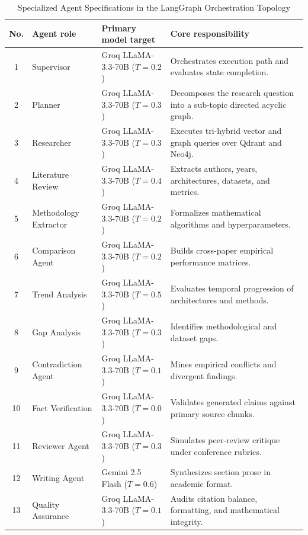 \documentclass[conference]{IEEEtran}
\begin{document}
\begin{table}[!t]
\caption{Specialized Agent Specifications in the LangGraph Orchestration Topology}
\label{tab:agents}
\centering
\footnotesize
\begin{tabularx}{\textwidth}{@{}c l l X@{}}
\toprule
\textbf{No.} & \textbf{Agent role} & \textbf{Primary model target} & \textbf{Core responsibility} \\
\midrule
1 & Supervisor & Groq LLaMA-3.3-70B ($T=0.2$) & Orchestrates execution path and evaluates state completion. \\
2 & Planner & Groq LLaMA-3.3-70B ($T=0.3$) & Decomposes the research question into a sub-topic directed acyclic graph. \\
3 & Researcher & Groq LLaMA-3.3-70B ($T=0.3$) & Executes tri-hybrid vector and graph queries over Qdrant and Neo4j. \\
4 & Literature Review & Groq LLaMA-3.3-70B ($T=0.4$) & Extracts authors, years, architectures, datasets, and metrics. \\
5 & Methodology Extractor & Groq LLaMA-3.3-70B ($T=0.2$) & Formalizes mathematical algorithms and hyperparameters. \\
6 & Comparison Agent & Groq LLaMA-3.3-70B ($T=0.2$) & Builds cross-paper empirical performance matrices. \\
7 & Trend Analysis & Groq LLaMA-3.3-70B ($T=0.5$) & Evaluates temporal progression of architectures and methods. \\
8 & Gap Analysis & Groq LLaMA-3.3-70B ($T=0.3$) & Identifies methodological and dataset gaps. \\
9 & Contradiction Agent & Groq LLaMA-3.3-70B ($T=0.1$) & Mines empirical conflicts and divergent findings. \\
10 & Fact Verification & Groq LLaMA-3.3-70B ($T=0.0$) & Validates generated claims against primary source chunks. \\
11 & Reviewer Agent & Groq LLaMA-3.3-70B ($T=0.3$) & Simulates peer-review critique under conference rubrics. \\
12 & Writing Agent & Gemini 2.5 Flash ($T=0.6$) & Synthesizes section prose in academic format. \\
13 & Quality Assurance & Groq LLaMA-3.3-70B ($T=0.1$) & Audits citation balance, formatting, and mathematical integrity. \\
\bottomrule
\end{tabularx}
\end{table}
\end{document}
